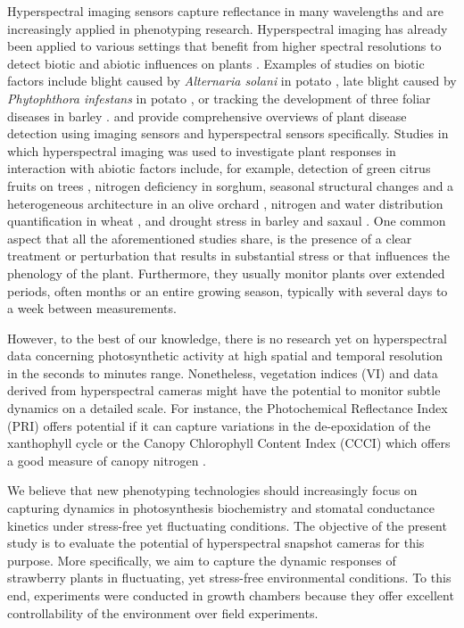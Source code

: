 \documentclass[10pt,authoryear,a4paper,review]{elsarticle}
\begin{document}
    Hyperspectral imaging sensors capture reflectance in many wavelengths and are increasingly applied in phenotyping research. Hyperspectral imaging has already been applied to various settings that benefit from higher spectral resolutions to detect biotic and abiotic influences on plants \citep{khanModern2018}. Examples of studies on biotic factors include blight caused by \textit{Alternaria solani} in potato \citep{vandevijverInfield2020}, late blight caused by \textit{Phytophthora infestans} in potato \citep{franceschiniFeasibility2019}, or tracking the development of three foliar diseases in barley \citep{wahabzadaPlant2016}. \citet{mahleinPlant2015} and \citet{loweHyperspectral2017} provide comprehensive overviews of plant disease detection using imaging sensors and hyperspectral sensors specifically. Studies in which hyperspectral imaging was used to investigate plant responses in interaction with abiotic factors include, for example, detection of green citrus fruits on trees \citep{okamotoGreen2009}, nitrogen deficiency in sorghum, seasonal structural changes and a heterogeneous architecture in an olive orchard \citep{zarco-tejadaSpatiotemporal2013}, nitrogen and water distribution quantification in wheat \citep{bruningDevelopment2019}, and drought stress in barley and saxaul \citep{behmannDetection2014,jinHyperspectral2016}. One common aspect that all the aforementioned studies share, is the presence of a clear treatment or perturbation that results in substantial stress or that influences the phenology of the plant. Furthermore, they usually monitor plants over extended periods, often months or an entire growing season, typically with several days to a week between measurements. 
 
    However, to the best of our knowledge, there is no research yet on hyperspectral data concerning photosynthetic activity at high spatial and temporal resolution in the seconds to minutes range. Nonetheless, vegetation indices (VI) and data derived from hyperspectral cameras might have the potential to monitor subtle dynamics on a detailed scale. For instance, the Photochemical Reflectance Index (PRI) offers potential if it can capture variations in the de-epoxidation of the xanthophyll cycle \citep{alonsoDiurnal2017} or the Canopy Chlorophyll Content Index (CCCI) which offers a good measure of canopy nitrogen \citep{barnesCoincident2000}. 
 
    We believe that new phenotyping technologies should increasingly focus on capturing dynamics in photosynthesis biochemistry and stomatal conductance kinetics under stress-free yet fluctuating conditions. The objective of the present study is to evaluate the potential of hyperspectral snapshot cameras for this purpose. More specifically, we aim to capture the dynamic responses of strawberry plants in fluctuating, yet stress-free environmental conditions. To this end, experiments were conducted in growth chambers because they offer excellent controllability of the environment over field experiments.
\end{document}
